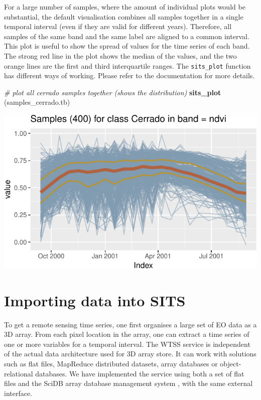 \documentclass[11pt,]{article}
\newenvironment{Shaded}{\begin{snugshade}}{\end{snugshade}}
\newcommand{\KeywordTok}[1]{\textcolor[rgb]{0.13,0.29,0.53}{\textbf{#1}}}
\newcommand{\CommentTok}[1]{\textcolor[rgb]{0.56,0.35,0.01}{\textit{#1}}}
\newcommand{\NormalTok}[1]{#1}
\begin{document}
For a large number of samples, where the amount of individual plots
would be substantial, the default visualisation combines all samples
together in a single temporal interval (even if they are valid for
different years). Therefore, all samples of the same band and the same
label are aligned to a common interval. This plot is useful to show the
spread of values for the time series of each band. The strong red line
in the plot shows the median of the values, and the two orange lines are
the first and third interquartile ranges. The \texttt{sits\_plot}
function has different ways of working. Please refer to the
documentation for more details.

\begin{Shaded}
\begin{Highlighting}[]
\CommentTok{# plot all cerrado samples together (shows the distribution)}
\KeywordTok{sits_plot}\NormalTok{ (samples_cerrado.tb)}
\end{Highlighting}
\end{Shaded}

\begin{center}\includegraphics{sits_description_files/figure-latex/unnamed-chunk-11-1} \end{center}

\section{Importing data into SITS}\label{importing-data-into-sits}

To get a remote sensing time series, one first organises a large set of
EO data as a 3D array. From each pixel location in the array, one can
extract a time series of one or more variables for a temporal interval.
The WTSS service is independent of the actual data architecture used for
3D array store. It can work with solutions such as flat files, MapReduce
distributed datasets, array databases or object-relational databases. We
have implemented the service using both a set of flat files and the
SciDB array database management system \cite{Stonebraker2013}, with the
same external interface.
\end{document}
